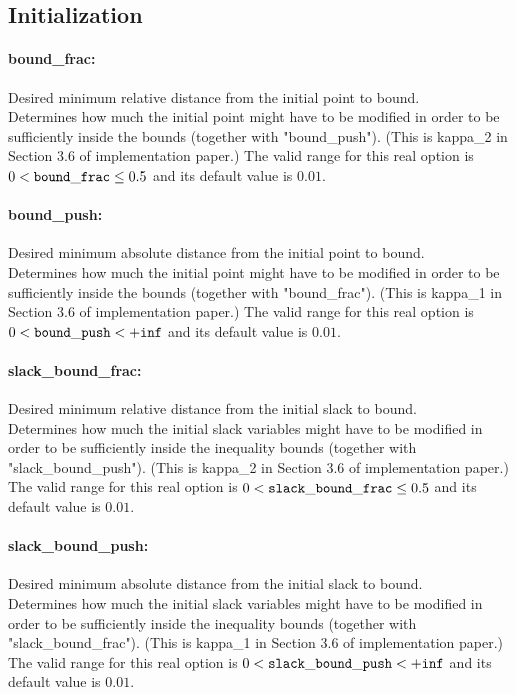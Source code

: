 \subsection{Initialization}

\paragraph{bound\_frac:}\label{opt:bound_frac} Desired minimum relative distance from the initial point to bound. \\
 Determines how much the initial point might have
to be modified in order to be sufficiently inside
the bounds (together with "bound\_push").  (This
is kappa\_2 in Section 3.6 of implementation
paper.) The valid range for this real option is 
$0 <  {\tt bound\_frac } \le 0.5$
and its default value is $0.01$.


\paragraph{bound\_push:}\label{opt:bound_push} Desired minimum absolute distance from the initial point to bound. \\
 Determines how much the initial point might have
to be modified in order to be sufficiently inside
the bounds (together with "bound\_frac").  (This
is kappa\_1 in Section 3.6 of implementation
paper.) The valid range for this real option is 
$0 <  {\tt bound\_push } <  {\tt +inf}$
and its default value is $0.01$.


\paragraph{slack\_bound\_frac:}\label{opt:slack_bound_frac} Desired minimum relative distance from the initial slack to bound. \\
 Determines how much the initial slack variables
might have to be modified in order to be
sufficiently inside the inequality bounds
(together with "slack\_bound\_push").  (This is
kappa\_2 in Section 3.6 of implementation paper.) The valid range for this real option is 
$0 <  {\tt slack\_bound\_frac } \le 0.5$
and its default value is $0.01$.


\paragraph{slack\_bound\_push:}\label{opt:slack_bound_push} Desired minimum absolute distance from the initial slack to bound. \\
 Determines how much the initial slack variables
might have to be modified in order to be
sufficiently inside the inequality bounds
(together with "slack\_bound\_frac").  (This is
kappa\_1 in Section 3.6 of implementation paper.) The valid range for this real option is 
$0 <  {\tt slack\_bound\_push } <  {\tt +inf}$
and its default value is $0.01$.


